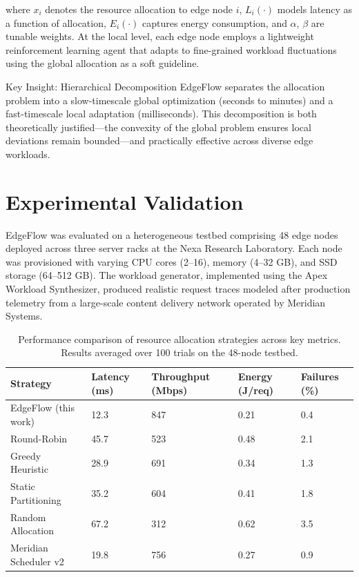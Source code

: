 \documentclass[12pt,oneside]{report}
\begin{document}
where $x_i$ denotes the resource allocation to edge node $i$, $L_i(\cdot)$ models latency as a function of allocation, $E_i(\cdot)$ captures energy consumption, and $\alpha$, $\beta$ are tunable weights. At the local level, each edge node employs a lightweight reinforcement learning agent that adapts to fine-grained workload fluctuations using the global allocation as a soft guideline.

\begin{keyconcept}{Key Insight: Hierarchical Decomposition}
EdgeFlow separates the allocation problem into a slow-timescale global optimization (seconds to minutes) and a fast-timescale local adaptation (milliseconds). This decomposition is both theoretically justified---the convexity of the global problem ensures local deviations remain bounded---and practically effective across diverse edge workloads.
\end{keyconcept}

\section{Experimental Validation}

EdgeFlow was evaluated on a heterogeneous testbed comprising 48 edge nodes deployed across three server racks at the Nexa Research Laboratory. Each node was provisioned with varying CPU cores (2--16), memory (4--32 GB), and SSD storage (64--512 GB). The workload generator, implemented using the Apex Workload Synthesizer, produced realistic request traces modeled after production telemetry from a large-scale content delivery network operated by Meridian Systems.

\begin{table}[htbp]
\centering
\caption{Performance comparison of resource allocation strategies across key metrics. Results averaged over 100 trials on the 48-node testbed.}
\label{tab:results}
\begin{tabularx}{\textwidth}{lXXXX}
\toprule
Strategy & Latency (ms) & Throughput (Mbps) & Energy (J/req) & Failures (\%) \\
\midrule
EdgeFlow (this work)   & 12.3 & 847 & 0.21 & 0.4 \\
Round-Robin             & 45.7 & 523 & 0.48 & 2.1 \\
Greedy Heuristic        & 28.9 & 691 & 0.34 & 1.3 \\
Static Partitioning     & 35.2 & 604 & 0.41 & 1.8 \\
Random Allocation       & 67.2 & 312 & 0.62 & 3.5 \\
Meridian Scheduler v2   & 19.8 & 756 & 0.27 & 0.9 \\
\bottomrule
\end{tabularx}
\end{table}
\end{document}

